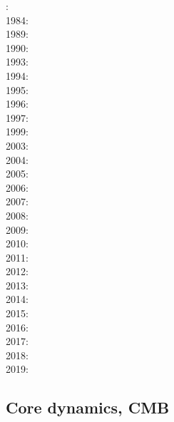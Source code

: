 : \cite{waki75a}\cite{waki75b}\\
1984: \cite{yusa84}\\
1989: \cite{blbc89}\\
1990: \cite{trab90}\\
1993: \cite{leka93}\\
1994: \cite{brsa94}\\
1995: \cite{brsa95}\cite{moso95}\cite{full95}\\
1996: \cite{zhon96}\cite{mozg96}\\
1997: \cite{rist97}\\
1999: \cite{lind99}\cite{bird99}\\
2003: \cite{taki03}\cite{modm03}\cite{geyu03}\cite{geyu03b}\\
2004: \cite{kaps04}\cite{kasa04}\cite{kaks08}\\
2005: \cite{mure05}\\
2006: \cite{kapo06}\cite{more06}\cite{omma06}\\
2007: \cite{toma07}\cite{chcc07}\cite{kabe07}\cite{kaks07}\cite{moql07}\cite{geyu07}\\
2008: \cite{zhmt08}\cite{deka08}\cite{trub08}\cite{krdp08}\cite{mamo08}\cite{gepd98}\cite{vack08}\cite{brtf08}\\
2009: \cite{king09}\cite{geum09}\cite{vemm09}\\
2010: \cite{kaus10}\cite{kamm10}\cite{egat10}\cite{kilv10}\\
2011: \cite{dumg11}\cite{uibb11}\cite{hegc11}\\
2012: \cite{crsg12}\cite{chgv12}\cite{krwd12}\cite{may12}\cite{gerb12}\\
2013: \cite{chtl13}\cite{kemk13}\cite{gemd13}\\
2014: \cite{thmk14}\cite{mabl14}\cite{lopp14}\\
2015: \cite{lelk15}\cite{rumi15}\cite{chpe15}\cite{mabl15}\\
2016: \cite{dumy16}\cite{blmp16}\\
2017: \cite{robh17}\cite{wisv17}\cite{majc17}\\
2018: \cite{memm18}\\
2019: \cite{clhe19}\cite{liki19}\cite{demh19}\cite{galb19}

\subsection*{Core dynamics, CMB}

